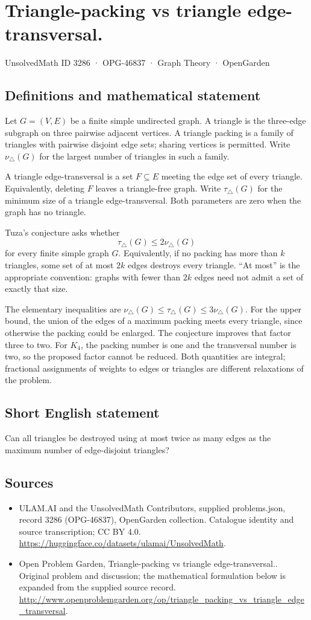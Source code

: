 \documentclass[11pt,a4paper]{article}
\begin{document}
\section*{Triangle-packing vs triangle edge-transversal.}\label{3286}
{\small UnsolvedMath ID 3286 · OPG-46837 · Graph Theory · OpenGarden}
\subsection{Definitions and mathematical statement}
Let $G=(V,E)$ be a finite simple undirected graph. A triangle is the
three-edge subgraph on three pairwise adjacent vertices. A triangle
packing is a family of triangles with pairwise disjoint edge sets;
sharing vertices is permitted. Write $\nu_{\triangle}(G)$ for the largest
number of triangles in such a family.

A triangle edge-transversal is a set $F\subseteq E$ meeting the edge set
of every triangle. Equivalently, deleting $F$ leaves a triangle-free
graph. Write $\tau_{\triangle}(G)$ for the minimum size of a triangle
edge-transversal. Both parameters are zero when the graph has no
triangle.

Tuza's conjecture asks whether
\[
                    \tau_{\triangle}(G)\le2\nu_{\triangle}(G)
\]
for every finite simple graph $G$. Equivalently, if no packing has more
than $k$ triangles, some set of at most $2k$ edges destroys every
triangle. ``At most'' is the appropriate convention: graphs with fewer
than $2k$ edges need not admit a set of exactly that size.

The elementary inequalities are
$\nu_{\triangle}(G)\le\tau_{\triangle}(G)\le3\nu_{\triangle}(G)$.
For the upper bound, the union of the edges of a maximum packing
meets every triangle, since otherwise the packing could be enlarged.
The conjecture improves that factor three to two. For $K_4$, the
packing number is one and the transversal number is two, so the
proposed factor cannot be reduced. Both quantities are integral;
fractional assignments of weights to edges or triangles are different
relaxations of the problem.
\subsection{Short English statement}
Can all triangles be destroyed using at most twice as many edges as the maximum number of edge-disjoint triangles?
\subsection{Sources}
\begin{itemize}
\item[S1] ULAM.AI and the UnsolvedMath Contributors, supplied problems.json, record 3286 (OPG-46837), OpenGarden collection. Catalogue identity and source transcription; CC BY 4.0.
\url{https://huggingface.co/datasets/ulamai/UnsolvedMath}.
\item[S2] Open Problem Garden, Triangle-packing vs triangle edge-transversal.. Original problem and discussion; the mathematical formulation below is expanded from the supplied source record.
\url{http://www.openproblemgarden.org/op/triangle_packing_vs_triangle_edge_transversal}.
\end{itemize}
\end{document}
